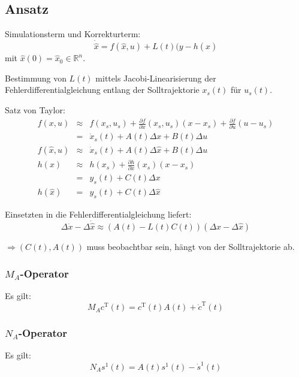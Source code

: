 \subsection{Ansatz}
Simulationsterm und Korrekturterm:
\begin{equation}
    \dot{\hat{x}} = f(\hat{x}, u) + L(t) (y- h(\hat{x}) 
\end{equation}
mit $\hat{x}(0) = \hat{x}_0 \in \mathbb{R}^n$.

Bestimmung von $L(t)$ mittels Jacobi-Linearisierung der Fehlerdifferentialgleichung 
entlang der Solltrajektorie $x_s(t)$ für $u_s(t)$.

Satz von Taylor:
\begin{eqnarray}
    f(x,u) &\approx& f(x_s, u_s) + \frac{\partial f}{\partial x}(x_s, u_s) (x -x_s)
                + \frac{\partial f}{\partial u}(u-u_s) \\
            &=& \dot{x}_s(t) + A(t) \Delta x + B(t) \Delta u \\
    f(\hat{x}, u) &\approx& \dot{x}_s(t) + A(t) \Delta \hat{x} + B(t) \Delta u \\
    h(x) &\approx& h(x_s) + \frac{\partial h}{\partial x}(x_s) (x-x_s) \\
            &=& y_s(t) + C(t) \Delta x \\
    h(\hat{x}) &=& y_s(t) + C(t) \Delta \hat{x}
\end{eqnarray}

Einsetzten in die Fehlerdifferentialgleichung liefert:
\begin{equation}
    \Delta \dot{x} - \Delta \dot{\hat{x}} \approx
        (A(t) - L(t) C(t)) (\Delta x - \Delta \hat{x})
\end{equation}

$\Rightarrow (C(t), A(t))$ muss beobachtbar sein, hängt von der Solltrajektorie ab.

\subsubsection{$M_A$-Operator}
Es gilt:
\begin{equation}
    M_A c^\text{T} (t) = c^\text{T} (t) A(t) + \dot{c}^\text{T} (t)
\end{equation}

\subsubsection{$N_A$-Operator}
Es gilt:
\begin{equation}
    N_A s^1(t) = A(t) s^1(t) - \dot{s}^1(t)
\end{equation}

